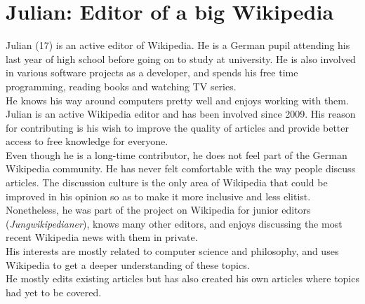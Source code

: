 \section{Julian: Editor of a big Wikipedia}
Julian (17) is an active editor of Wikipedia. He is a German pupil attending his last year of high school before going on to study at university. He is also involved in various software projects as a developer,  and spends his free time programming, reading books and watching TV series. \\
He knows his way around computers pretty well and enjoys working with them.  \\
Julian is an active Wikipedia editor and has been involved since 2009. His reason for contributing is his wish to improve the quality of articles and provide better access to free knowledge for everyone. \\
Even though he is a long-time contributor, he does not feel part of the German Wikipedia community. He has never felt comfortable with the way people discuss articles. The discussion culture is the only area of Wikipedia that could be improved in his opinion so as to make it more inclusive and less elitist. \\
Nonetheless, he was part of the project on Wikipedia for junior editors (\textit{Jungwikipedianer}), knows many other editors, and enjoys discussing the most recent Wikipedia news with them in private. \\
His interests are mostly related to computer science and philosophy, and uses Wikipedia to get a deeper understanding of these topics. \\
He mostly edits existing articles but has also created his own articles where topics had yet to be covered.

